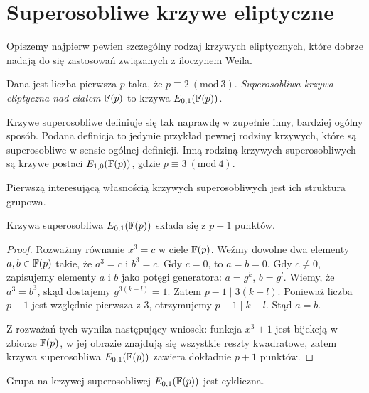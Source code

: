 \section{Superosobliwe krzywe eliptyczne}

\noindent
Opiszemy najpierw pewien szczególny rodzaj krzywych eliptycznych,
które dobrze nadają do się zastosowań związanych z iloczynem Weila.

\begin{definition}
Dana jest liczba pierwsza $p$ taka, że $p \equiv 2\ (\mathrm{mod}\ 3)$.
\emph{Superosobliwa krzywa eliptyczna nad ciałem $\mathbb{F}(p)$}
to krzywa $E_{0,1}(\mathbb{F}(p))$.
\end{definition}

\begin{remark}
Krzywe superosobliwe definiuje się tak naprawdę w zupełnie inny,
bardziej ogólny sposób. Podana definicja to jedynie przykład
pewnej rodziny krzywych, które są superosobliwe w sensie ogólnej definicji.
Inną rodziną krzywych superosobliwych są krzywe postaci $E_{1,0}(\mathbb{F}(p))$,
gdzie $p \equiv 3\ (\mathrm{mod}\ 4)$.
\end{remark}

\noindent
Pierwszą interesującą własnością krzywych superosobliwych
jest ich struktura grupowa.

\begin{theorem}
Krzywa superosobliwa $E_{0,1}(\mathbb{F}(p))$ składa się z $p + 1$ punktów.
\end{theorem}

\begin{proof}
Rozważmy równanie $x^3 = c$ w ciele $\mathbb{F}(p)$.
Weźmy dowolne dwa elementy $a, b \in \mathbb{F}(p)$ takie, że $a^3 = c$ i $b^3 = c$.
Gdy $c = 0$, to $a = b = 0$.
Gdy $c \neq 0$, zapisujemy elementy $a$ i $b$ jako potęgi generatora:
$a = g^k$, $b = g^l$.
Wiemy, że $a^3 = b^3$, skąd dostajemy $g^{3(k-l)} = 1$.
Zatem $p-1 \mid 3(k-l)$.
Ponieważ liczba $p-1$ jest względnie pierwsza z $3$,
otrzymujemy $p-1 \mid k-l$.
Stąd $a = b$.

\noindent
Z rozważań tych wynika następujący wniosek:
funkcja $x^3 + 1$ jest bijekcją w zbiorze $\mathbb{F}(p)$,
w jej obrazie znajdują się wszystkie reszty kwadratowe,
zatem krzywa superosobliwa $E_{0,1}(\mathbb{F}(p))$ zawiera dokładnie $p+1$ punktów.
\end{proof}

\begin{theorem}
Grupa na krzywej superosobliwej $E_{0,1}(\mathbb{F}(p))$
jest cykliczna.
\end{theorem}

